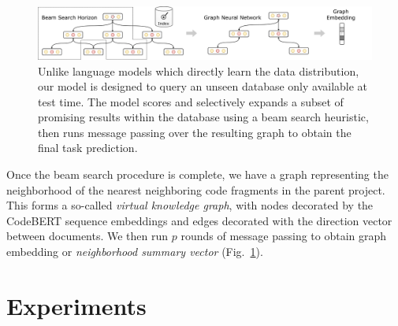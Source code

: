 \documentclass[11pt]{article}
\begin{document}
\begin{figure}[H]
  \centering
  \includegraphics[width=1.05\textwidth]{architecture}
  \caption{Unlike language models which directly learn the data distribution, our model is designed to query an unseen database only available at test time. The model scores and selectively expands a subset of promising results within the database using a beam search heuristic, then runs message passing over the resulting graph to obtain the final task prediction.}
  \label{fig:architecture}
\end{figure}

Once the beam search procedure is complete, we have a graph representing the neighborhood of the nearest neighboring code fragments in the parent project. This forms a so-called \textit{virtual knowledge graph}, with nodes decorated by the CodeBERT sequence embeddings and edges decorated with the direction vector between documents. We then run $p$ rounds of message passing to obtain graph embedding or \textit{neighborhood summary vector} (Fig.~\ref{fig:architecture}).

%

\section{Experiments}
\end{document}

